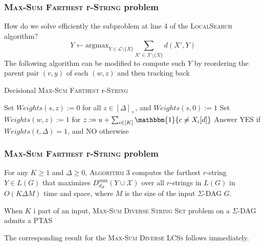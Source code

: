 \documentclass{beamer}
\begin{document}
\begin{frame}
    \frametitle{\textsc{Max-Sum Farthest} r-\textsc{String} problem}
    How do we solve efficiently the subproblem at line 4 of the \textsc{LocalSearch} algorithm?
    \[
    Y \gets \text{argmax}_{Y \in \mathcal{L} \setminus \{X\}} \sum_{X' \in \mathcal{X} \setminus \{X\}} d(X', Y)
    \]
    The following algorithm can be modified to compute such $Y$ by reordering the parent pair $(v, y)$ of each $(w, z)$ and then tracking back
    \begin{algorithm}[H] \label{alg:ExactMaxSumFarthest}
        \small{\caption{Decisional \textsc{Max-Sum Farthest} r-\textsc{String}}}
        \footnotesize{\begin{algorithmic}[1]
            \State Set $Weights(s, z) := 0$ for all $z \in [\Delta]_+$, and $Weights(s, 0) := 1$\;
                    \State Set $Weights(w, z) := 1$ for $z := u + \sum_{i \in [K]} \mathbbm{1}\{ c \not= X_i[d] \}$ 
                \EndFor
            \EndFor
            \State Answer YES if $Weights(t, \Delta) = 1$, and NO otherwise 
        \end{algorithmic}}
    \end{algorithm}
\end{frame}

\begin{frame}
    \frametitle{\textsc{Max-Sum Farthest} r-\textsc{String} problem}

    \begin{lemma}
        For any $K \geq 1$ and $\Delta \geq 0$, \textsc{Algorithm 3} computes the farthest $r$-string $Y \in L(G)$ that maximizes $D_{d_H}^{\text{sum}}(Y \cup \mathcal{X})$ over all $r$-strings in $L(G)$ in $O(K \Delta M)$ time and space, where $M$ is the size of the input $\Sigma$-DAG $G$.
    \end{lemma}

    \begin{theorem}
        When $K$ i part of an input, \textsc{Max-Sum Diverse String Set} problem on a $\Sigma$-DAG admits a PTAS
    \end{theorem}
    The corresponding result for the \textsc{Max-Sum Diverse LCSs} follows immediately.

\end{frame}
\end{document}
